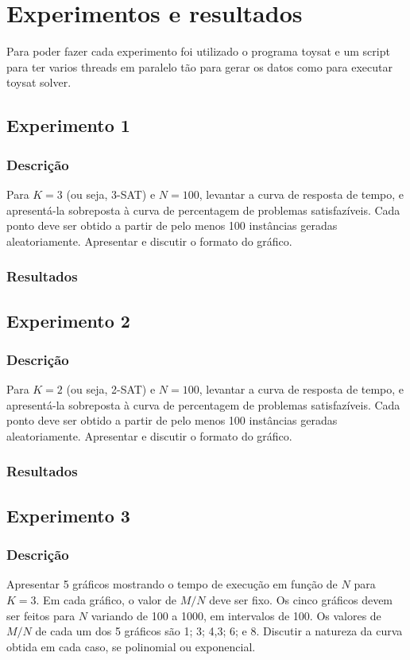 \section{Experimentos e resultados} 

Para poder fazer cada experimento foi utilizado o programa toysat \cite{ToySAT14} e um script para ter varios threads em paralelo tão para gerar os datos como para executar toysat solver.

\subsection{Experimento 1} 
	\subsubsection{Descrição}
		Para $K = 3$ (ou seja, 3-SAT) e $N = 100$, levantar a curva de resposta de tempo, e apresentá-la sobreposta à curva de percentagem de problemas satisfazíveis. Cada ponto deve ser obtido a partir de pelo menos 100 instâncias geradas aleatoriamente. Apresentar e discutir o formato do gráfico.
	\subsubsection{Resultados}
	
 \subsection{Experimento 2} 
	\subsubsection{Descrição}
		Para $K = 2$ (ou seja, 2-SAT) e $N = 100$, levantar a curva de resposta de tempo, e apresentá-la sobreposta à curva de percentagem de problemas satisfazíveis. Cada ponto deve ser obtido a partir de pelo menos 100 instâncias geradas aleatoriamente. Apresentar e discutir o formato do gráfico.
	\subsubsection{Resultados}

\subsection{Experimento 3} 
	\subsubsection{Descrição}
		Apresentar 5 gráficos mostrando o tempo de execução em função de $N$ para $K = 3$. Em cada gráfico, o valor de $M / N$ deve ser fixo. Os cinco gráficos devem ser feitos para $N$ variando de 100 a 1000, em intervalos de 100. Os valores de $M / N$ de cada um dos 5 gráficos são 1; 3; 4,3; 6; e 8. Discutir a natureza da curva obtida em cada caso, se polinomial ou exponencial.
